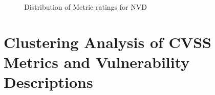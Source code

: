 







\begin{figure}
	\begin{center}
	\end{center}
	\caption{\label{fig:nvd_data}Distribution of Metric ratings for NVD}
\end{figure}


\section{Clustering Analysis of CVSS Metrics and Vulnerability Descriptions} \label{sec:important_keywords}

